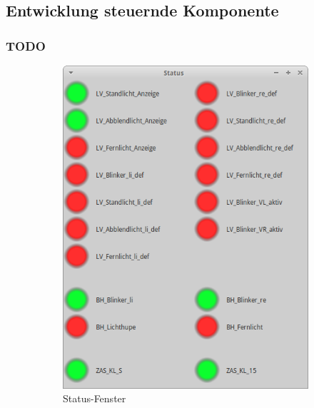 \documentclass[draft]{beamer}
\begin{document}
\subsection{Entwicklung steuernde Komponente}
\begin{frame}
\frametitle{TODO}
    \begin{figure}
        \centering
        \begin{subfigure}[b]{0.59\textwidth}
            \centering
            \includegraphics[width=\textwidth]{vcan_app_status}
            \caption{Status-Fenster}
            \label{fig:vcan_app_status}
        \end{subfigure}
        \begin{subfigure}[b]{0.39\textwidth}
            \centering

\end{subfigure}
\end{figure}
\end{frame}
\end{document}
